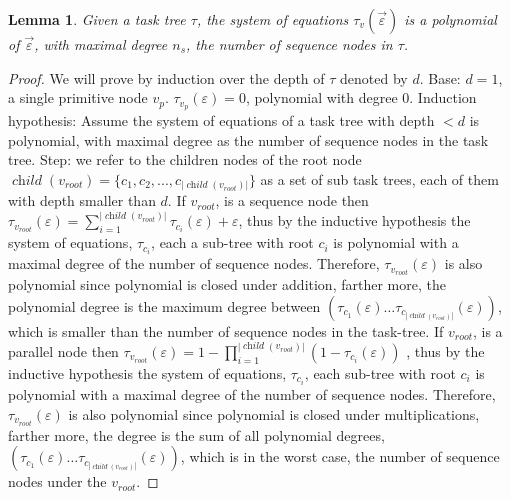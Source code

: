\documentclass{article}
\newtheorem{lemma}{Lemma}
\DeclareMathOperator{\ch}{\textit{child}}
\begin{document}
\begin{lemma}\label{lemma:poly}
Given a task tree $\tau$, the system of equations $ \tau_v(\overrightarrow{\varepsilon}) $ is a polynomial of $\overrightarrow{\varepsilon}$, with maximal degree ${n_s}$, the number of sequence nodes in $\tau$.  
\end{lemma}
\begin{proof}
We will prove by induction over the depth of $\tau$ denoted by $d$. Base: $ d=1$, a single primitive node $ v_p $. $\tau_{v_p}(\varepsilon)=0$, polynomial with degree 0.
Induction hypothesis: Assume the system of equations of a task tree with depth $ <d $ is polynomial, with maximal degree as the number of sequence nodes in the task tree. Step: we refer to the children nodes of the root node $\ch(v_{root})= \lbrace c_1, c_2,...,c_{|\ch(v_{root})|}\rbrace$ as a set of sub task trees, each of them with depth smaller than $ d $. If $v_{root}$, is a sequence node then $\tau_{v_{root}}(\varepsilon)=\sum_{i=1}^{|\ch(v_{root})|}\tau_{c_i}(\varepsilon) +  \varepsilon$, thus by the inductive hypothesis the system of equations, $ \tau_{c_i} $, each a sub-tree with root $ c_i $ is polynomial with a maximal degree of the number of sequence nodes. Therefore, $\tau_{v_{root}}(\varepsilon)$ is also polynomial since polynomial is closed under addition, farther more, the polynomial degree is the maximum degree between $\left( \tau_{c_1}(\varepsilon) \dots \tau_{c_{|\ch(v_{root})|}}(\varepsilon)\right)$, which is smaller than the number of sequence nodes in the task-tree. If $v_{root}$, is a parallel node then $\tau_{v_{root}}(\varepsilon)=1-\prod_{i=1}^{|\ch(v_{root})|} (1-\tau_{c_i}(\varepsilon))$ , thus by the inductive hypothesis the system of equations, $ \tau_{c_i} $, each sub-tree with root $ c_i $ is polynomial with a maximal degree of the number of sequence nodes. Therefore, $\tau_{v_{root}}(\varepsilon)$ is also polynomial since polynomial is closed under multiplications, farther more, the degree is the sum of all polynomial degrees, $\left( \tau_{c_1}(\varepsilon) \dots \tau_{c_{|\ch(v_{root})|}}(\varepsilon)\right)$, which is in the worst case, the number of sequence nodes under the $v_{root}$. 
\end{proof}


\end{document}
